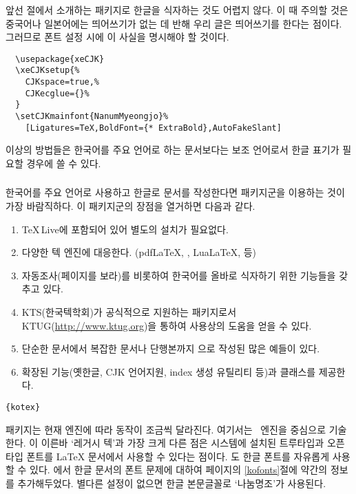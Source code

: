 앞선 절에서 소개하는  패키지로 한글을 식자하는 것도 어렵지 않다. 이 때 주의할 것은
중국어나 일본어에는 띄어쓰기가 없는 데 반해 우리 글은 띄어쓰기를 한다는 점이다. 그러므로 폰트 설정 시에 
이 사실을 명시해야 할 것이다.

\begin{verbatim}
  \usepackage{xeCJK}
  \xeCJKsetup{%
    CJKspace=true,%
    CJKecglue={}%
  }
  \setCJKmainfont{NanumMyeongjo}%
    [Ligatures=TeX,BoldFont={* ExtraBold},AutoFakeSlant]
\end{verbatim}

이상의 방법들은 한국어를 주요 언어로 하는 문서보다는 보조 언어로서 한글 표기가 필요할 경우에 쓸 수 있다.

\subsubsection[kotex]{\texorpdfstring{\koTeX}{koTeX}}
한국어를 주요 언어로 사용하고 한글로 문서를 작성한다면  패키지군을 이용하는 것이 가장 바람직하다.
이 패키지군의 장점을 열거하면 다음과 같다.
\begin{enumerate} \firmlist
  \item \TeX\,Live에 포함되어 있어 별도의 설치가 필요없다.
  \item 다양한 텍 엔진에 대응한다. (pdf\LaTeX, \XeLaTeX, Lua\LaTeX,  등)
  \item 자동조사(\pageref{autojosa}페이지를 보라)를 비롯하여 한국어를 올바로 식자하기 위한 기능들을 갖추고 있다.
  \item KTS(한국텍학회)가 공식적으로 지원하는 패키지로서 KTUG(\url{http://www.ktug.org})을 통하여 사용상의 도움을 얻을 수 있다.
  \item 단순한 문서에서 복잡한 문서나 단행본까지 으로 작성된 많은 예들이 있다.
  \item 확장된 기능(옛한글, CJK 언어지원, index 생성 유틸리티 등)과 클래스를 제공한다.
\end{enumerate}

\begin{lscommand}
  \texttt{\{kotex\}}
\end{lscommand}

 패키지는 현재 엔진에 따라 동작이 조금씩 달라진다. 여기서는 \XeLaTeX\ 엔진을 중심으로 기술한다.
\XeLaTeX 이 이른바 `레거시 텍'과 가장 크게 다른 점은 시스템에 설치된 트루타입과 오픈타입 폰트를 \LaTeX{} 문서에서 사용할 수 있다는 점이다. \koTeX 도 한글 폰트를 자유롭게 사용할 수 있다. \XeLaTeX 에서 한글 문서의 폰트 문제에 대하여 \pageref{kofonts}페이지의 \ref{kofonts}절에 약간의 정보를 추가해두었다. 별다른 설정이 없으면 한글 본문글꼴로 `나눔명조'가 사용된다.

